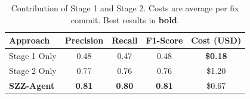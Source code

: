 \begin{table}[t]
\centering
\caption{Contribution of Stage 1 and Stage 2. Costs are average per fix commit. Best results in \textbf{bold}.}
\label{tab:stage_01_vs_stage_02}
\begin{tabular}{l ccc c}
\toprule
\textbf{Approach} & \textbf{Precision} & \textbf{Recall} & \textbf{F1-Score} & \textbf{Cost (USD)} \\
\midrule
Stage 1 Only & 0.48 & 0.47 & 0.48 & \textbf{\$0.18} \\
Stage 2 Only & 0.77 & 0.76 & 0.76 & \$1.20 \\
\midrule
\rowcolor{gray!20} \textbf{SZZ-Agent} & \textbf{0.81} & \textbf{0.80} & \textbf{0.81} & \$0.67 \\
\bottomrule
\end{tabular}
\end{table}
